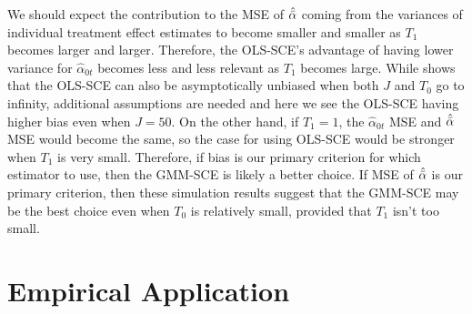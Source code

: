 \documentclass{article}
\begin{document}
We should expect the contribution to the MSE of $\hat{\Bar{\alpha}}$ coming from the variances of individual treatment effect estimates to become smaller and smaller as $T_1$ becomes larger and larger. Therefore, the OLS-SCE's advantage of having lower variance for $\hat{\alpha}_{0t}$ becomes less and less relevant as $T_1$ becomes large. While \cite{LargeSampleProperties} shows that the OLS-SCE can also be asymptotically unbiased when both $J$ and $T_0$ go to infinity, additional assumptions are needed and here we see the OLS-SCE having higher bias even when $J = 50$. On the other hand, if $T_1 = 1$, the $\hat{\alpha}_{0t}$ MSE and $\hat{\Bar{\alpha}}$ MSE would become the same, so the case for using OLS-SCE would be stronger when $T_1$ is very small. Therefore, if bias is our primary criterion for which estimator to use, then the GMM-SCE is likely a better choice. If MSE of $\hat{\Bar{\alpha}}$ is our primary criterion, then these simulation results suggest that the GMM-SCE may be the best choice even when $T_0$ is relatively small, provided that $T_1$ isn't too small.

\section{Empirical Application} \label{Empirical Application}
\end{document}
